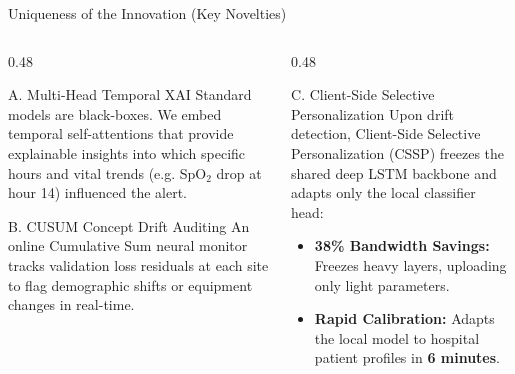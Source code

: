 \documentclass[aspectratio=169, 11pt]{beamer}
\begin{document}
\begin{frame}{Uniqueness of the Innovation (Key Novelties)}
    \begin{columns}[t]
        \begin{column}{0.48\textwidth}
            \begin{block}{\textcolor{neonCyan}{A.} Multi-Head Temporal XAI}
                \scriptsize
                Standard models are black-boxes. We embed temporal self-attentions that provide explainable insights into which specific hours and vital trends (e.g. SpO$_2$ drop at hour 14) influenced the alert.
            \end{block}
            
            \begin{block}{\textcolor{neonTeal}{B.} CUSUM Concept Drift Auditing}
                \scriptsize
                An online Cumulative Sum neural monitor tracks validation loss residuals at each site to flag demographic shifts or equipment changes in real-time.
            \end{block}
        \end{column}
        
        \begin{column}{0.48\textwidth}
            \begin{block}{\textcolor{neonAmber}{C.} Client-Side Selective Personalization}
                \scriptsize
                Upon drift detection, Client-Side Selective Personalization (CSSP) freezes the shared deep LSTM backbone and adapts only the local classifier head:
                \begin{itemize}
                    \item \textbf{38\% Bandwidth Savings:} Freezes heavy layers, uploading only light parameters.
                    \item \textbf{Rapid Calibration:} Adapts the local model to hospital patient profiles in \textbf{6 minutes}.
                \end{itemize}
            \end{block}
        \end{column}
    \end{columns}
\end{frame}
\end{document}
